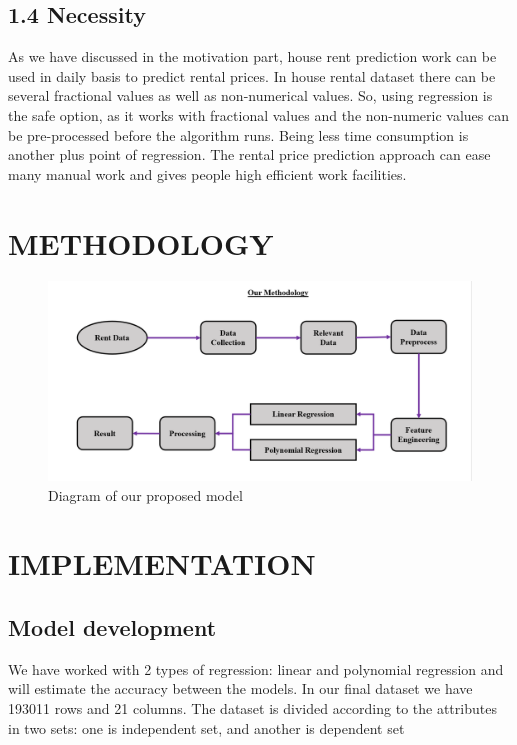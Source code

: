 \documentclass[conference]{IEEEtran}[10]
\begin{document}
\subsection*{1.4 Necessity}
As we have discussed in the motivation part, house rent prediction work can be used in daily basis to predict rental prices. In house rental dataset there can be several fractional values as well as non-numerical values. So, using regression is the safe option, as it works with fractional values and the non-numeric values can be pre-processed before the algorithm runs. Being less time consumption is another plus point of regression. The rental price prediction approach can ease many  manual work and gives people high efficient work facilities. 

\section{METHODOLOGY}
\begin{figure}[H]
\centering
\includegraphics[scale=0.2]{methodology}
\caption{ Diagram of our proposed model}
\end{figure}
\section{IMPLEMENTATION}
\subsection{Model development}
We have worked with 2 types of regression: linear and polynomial regression and will estimate the accuracy between the models. In our final dataset we have 193011 rows and 21 columns. The dataset is divided according to the attributes in two sets: one is independent set, and another is dependent set
\end{document}
